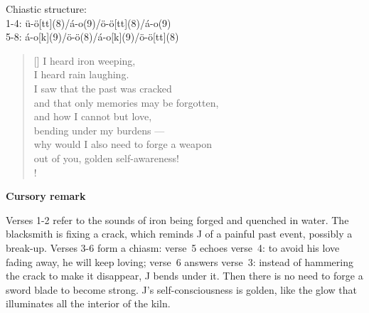 \documentclass[a4paper,12pt,twoside,final]{book}
\begin{document}
\noindent Chiastic structure: \\
1-4: ü-ö[tt](8)/á-o(9)/ö-ö[tt](8)/á-o(9) \\
5-8: á-o[k](9)/ö-ö(8)/á-o[k](9)/ö-ö[tt](8)

\newpage


\settowidth{\versewidth}{and that only a memory can be forgotten;}

\begin{verse}[\versewidth]
  I heard iron weeping, \\
  I heard rain laughing. \\
  I saw that the past was cracked \\
  and that only memories may be forgotten, \\
  and how I cannot but love, \\
  bending under my burdens --- \\
  why would I also need to forge a weapon \\
  out of you, golden self-awareness! \\!
\end{verse}


\bigskip

\noindent \textbf{Cursory remark}

\medskip

Verses 1-2 refer to the sounds of iron being forged and quenched in
water. The blacksmith is fixing a crack, which reminds J of a painful
past event, possibly a break\hyp{}up. Verses 3-6 form a chiasm:
verse~5 echoes verse~4: to avoid his love fading away, he will keep
loving; verse~6 answers verse~3: instead of hammering the crack to
make it disappear, J bends under it. Then there is no need to forge a
sword blade to become strong. J's self\hyp{}consciousness is golden,
like the glow that illuminates all the interior of the kiln.

\newpage

\settowidth{\versewidth}{s hogy nem tudok mást, mint szeretni,}
\end{document}
